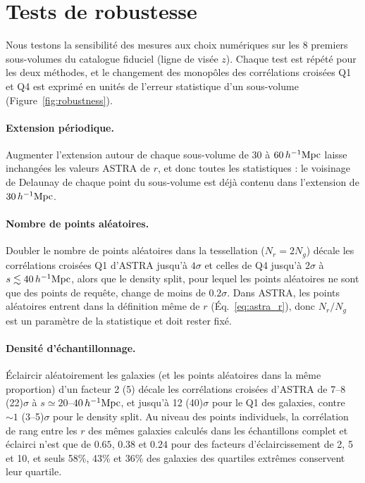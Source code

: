 \section{Tests de robustesse}
\label{sec:robustness}

Nous testons la sensibilité des mesures aux choix numériques sur les 8 premiers sous-volumes du catalogue fiduciel (ligne de visée $z$). Chaque test est répété pour les deux méthodes, et le changement des monopôles des corrélations croisées Q1 et Q4 est exprimé en unités de l'erreur statistique d'un sous-volume (Figure~\ref{fig:robustness}).

\paragraph{Extension périodique.} Augmenter l'extension autour de chaque sous-volume de 30 à $60\,h^{-1}\mathrm{Mpc}$ laisse inchangées les valeurs ASTRA de $r$, et donc toutes les statistiques : le voisinage de Delaunay de chaque point du sous-volume est déjà contenu dans l'extension de $30\,h^{-1}\mathrm{Mpc}$.

\paragraph{Nombre de points aléatoires.} Doubler le nombre de points aléatoires dans la tessellation ($N_r=2N_g$) décale les corrélations croisées Q1 d'ASTRA jusqu'à $4\sigma$ et celles de Q4 jusqu'à $2\sigma$ à $s\lesssim40\,h^{-1}\mathrm{Mpc}$, alors que le density split, pour lequel les points aléatoires ne sont que des points de requête, change de moins de $0.2\sigma$. Dans ASTRA, les points aléatoires entrent dans la définition même de $r$ (Éq.~\ref{eq:astra_r}), donc $N_r/N_g$ est un paramètre de la statistique et doit rester fixé.

\paragraph{Densité d'échantillonnage.} Éclaircir aléatoirement les galaxies (et les points aléatoires dans la même proportion) d'un facteur 2 (5) décale les corrélations croisées d'ASTRA de 7--8 (22)$\sigma$ à $s\simeq20$--$40\,h^{-1}\mathrm{Mpc}$, et jusqu'à 12 (40)$\sigma$ pour le Q1 des galaxies, contre $\sim1$ (3--5)$\sigma$ pour le density split. Au niveau des points individuels, la corrélation de rang entre les $r$ des mêmes galaxies calculés dans les échantillons complet et éclairci n'est que de $0.65$, $0.38$ et $0.24$ pour des facteurs d'éclaircissement de 2, 5 et 10, et seuls 58\%, 43\% et 36\% des galaxies des quartiles extrêmes conservent leur quartile.

